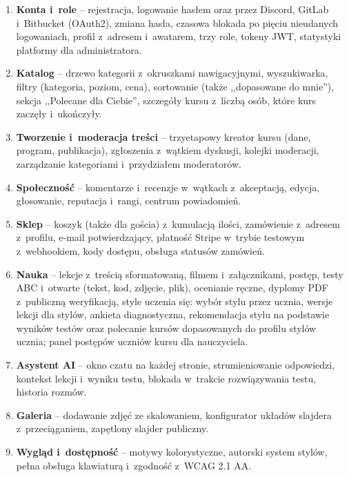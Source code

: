 \begin{enumerate}[label=\textbf{M\arabic*.},leftmargin=1.2cm]
  \item \textbf{Konta i~role} -- rejestracja, logowanie hasłem oraz przez Discord, GitLab
        i~Bitbucket (OAuth2), zmiana hasła, czasowa blokada po pięciu nieudanych logowaniach,
        profil z~adresem i~awatarem, trzy role, tokeny JWT, statystyki platformy dla administratora.
  \item \textbf{Katalog} -- drzewo kategorii z~okruszkami nawigacyjnymi, wyszukiwarka,
        filtry (kategoria, poziom, cena), sortowanie (także ,,dopasowane do mnie''), sekcja
        ,,Polecane dla Ciebie'', szczegóły kursu z~liczbą osób, które kurs zaczęły i~ukończyły.
  \item \textbf{Tworzenie i~moderacja treści} -- trzyetapowy kreator kursu (dane, program,
        publikacja), zgłoszenia z~wątkiem dyskusji, kolejki moderacji, zarządzanie
        kategoriami i~przydziałem moderatorów.
  \item \textbf{Społeczność} -- komentarze i~recenzje w~wątkach z~akceptacją, edycja,
        głosowanie, reputacja i~rangi, centrum powiadomień.
  \item \textbf{Sklep} -- koszyk (także dla gościa) z~kumulacją ilości, zamówienie z~adresem
        z~profilu, e-mail potwierdzający, płatność Stripe w~trybie testowym z~webhookiem,
        kody dostępu, obsługa statusów zamówień.
  \item \textbf{Nauka} -- lekcje z~treścią sformatowaną, filmem i~załącznikami, postęp,
        testy ABC i~otwarte (tekst, kod, zdjęcie, plik), ocenianie ręczne, dyplomy PDF
        z~publiczną weryfikacją, style uczenia się: wybór stylu przez ucznia, wersje lekcji
        dla stylów, ankieta diagnostyczna, rekomendacja stylu na podstawie wyników testów
        oraz polecanie kursów dopasowanych do profilu stylów ucznia; panel postępów uczniów
        kursu dla nauczyciela.
  \item \textbf{Asystent AI} -- okno czatu na każdej stronie, strumieniowanie odpowiedzi,
        kontekst lekcji i~wyniku testu, blokada w~trakcie rozwiązywania testu, historia
        rozmów.
  \item \textbf{Galeria} -- dodawanie zdjęć ze skalowaniem, konfigurator układów slajdera
        z~przeciąganiem, zapętlony slajder publiczny.
  \item \textbf{Wygląd i~dostępność} -- motywy kolorystyczne, autorski system stylów,
        pełna obsługa klawiaturą i~zgodność z~WCAG 2.1 AA.
\end{enumerate}

